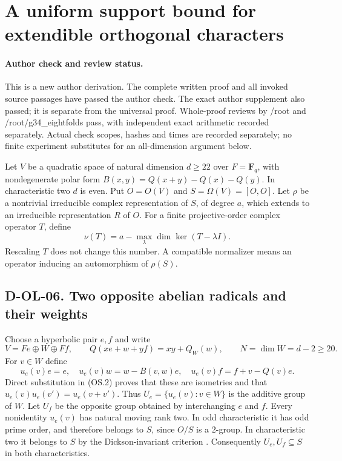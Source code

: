 \section{A uniform support bound for extendible orthogonal characters}
\label{sec:orthogonal-extendible-support}

\paragraph{Author check and review status.}
This is a new author derivation.  The complete written proof and
all invoked source passages have passed the author check.  The
exact author supplement also passed; it is separate from the
universal proof. Whole-proof reviews by /root and /root/g34\_eightfolds
pass, with independent exact arithmetic recorded separately. Actual
check scopes, hashes and times are recorded separately; no finite
experiment substitutes for an all-dimension argument below.

Let $V$ be a quadratic space of natural dimension $d\ge22$ over
$F=\mathbf F_q$, with nondegenerate polar form
$B(x,y)=Q(x+y)-Q(x)-Q(y)$.  In characteristic two $d$ is even.
Put $O=O(V)$ and $S=\Omega(V)=[O,O]$.  Let $\rho$ be a nontrivial
irreducible complex representation of $S$, of degree $a$, which
extends to an irreducible representation $R$ of $O$.  For a finite
projective-order complex operator $T$, define
\[
 \nu(T)=a-\max_{\lambda}\dim\ker(T-\lambda I).
 \tag{OS.1}
\]
Rescaling $T$ does not change this number.  A compatible normalizer
means an operator inducing an automorphism of $\rho(S)$.

\subsection*{D-OL-06. Two opposite abelian radicals and their weights}

Choose a hyperbolic pair $e,f$ and write
\[
 V=Fe\oplus W\oplus Ff,\qquad
 Q(xe+w+yf)=xy+Q_W(w),\qquad N=\dim W=d-2\ge20.
 \tag{OS.2}
\]
For $v\in W$ define
\[
 u_e(v)e=e,\quad
 u_e(v)w=w-B(v,w)e,\quad
 u_e(v)f=f+v-Q(v)e.
 \tag{OS.3}
\]
Direct substitution in (OS.2) proves that these are isometries and
that $u_e(v)u_e(v')=u_e(v+v')$.  Thus
$U_e=\{u_e(v):v\in W\}$ is the additive group of $W$.
Let $U_f$ be the opposite group obtained by interchanging $e$ and $f$.
Every nonidentity $u_e(v)$ has natural moving rank two.  In odd
characteristic it has odd prime order, and therefore belongs to $S$,
since $O/S$ is a $2$-group.  In characteristic two it belongs to $S$
by the Dickson-invariant criterion
\cite[Lemma~2.1, p.~383]{OS:TaylorVinroot2018}.  Consequently
$U_e,U_f\subseteq S$ in both characteristics.

